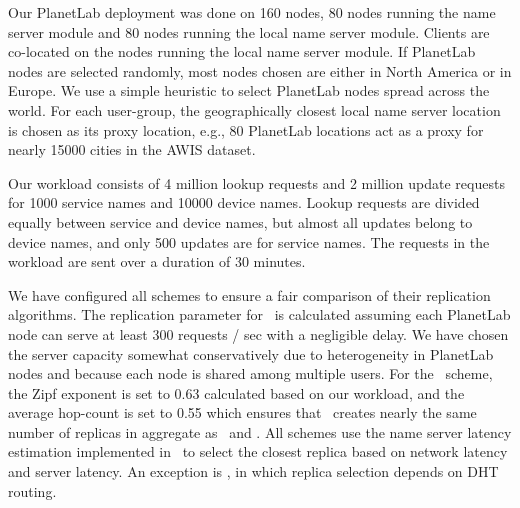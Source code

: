 %





Our PlanetLab deployment was done on 160 nodes, 80 nodes running the name server module and 80 nodes running the local name server module. Clients are co-located on the nodes running the local name server module. If PlanetLab nodes are selected randomly, most nodes chosen are either in North America or in Europe.  We use a simple heuristic to select PlanetLab nodes spread across the world. 
For each user-group, the geographically closest local name server location is chosen as its proxy location, e.g., 80 PlanetLab locations  act as a proxy for nearly 15000 cities in the AWIS dataset.


Our workload consists of 4 million lookup requests and 2 million update  requests for  1000 service names and 10000 device names.  Lookup requests are divided equally between service and device names, but almost all updates belong to device names, and only 500 updates are for service names. The requests in the workload are sent over a duration of 30 minutes.


We have configured all schemes to ensure a fair comparison of their replication algorithms. The replication parameter for \locaware\ is calculated assuming each PlanetLab node can serve at least 300 requests / sec with a negligible delay. We have chosen the server capacity somewhat conservatively due to heterogeneity in PlanetLab nodes and because each node is shared among multiple users. 
For the \codons\ scheme, the Zipf exponent is set to $0.63$ calculated based on our workload, and the average hop-count is set to 0.55 which ensures that \codons\ creates nearly the same number of replicas in aggregate as \locaware\ and \uniform.  All schemes use the name server latency estimation implemented in \auspice\  to select the closest replica based on network latency and server latency. An exception is \codons, in which replica selection depends on DHT routing. 

